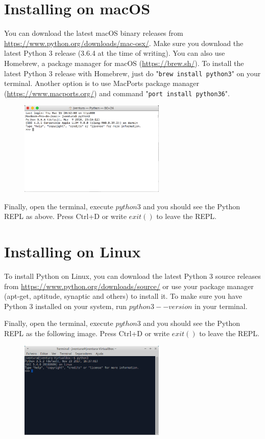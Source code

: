 \section{Installing on macOS}

You can download the latest macOS binary releases from \url{https://www.python.org/downloads/mac-osx/}. Make sure you download the latest Python 3 release (3.6.4 at the time of writing). You can also use Homebrew, a package manager for macOS (\url{https://brew.sh/}). To install the latest Python 3 release with Homebrew, just do "\texttt{brew install python3}" on your terminal. Another option is to use MacPorts package manager (\url{https://www.macports.org/}) and command "\texttt{port install python36}".  


\begin{figure}[H]
	\centering
  	\includegraphics[width=0.62\textwidth]{images/python_macos.png}
\end{figure}

Finally, open the terminal, execute $python3$ and you should see the Python REPL as above. Press Ctrl+D or write $exit()$ to leave the REPL.

\section{Installing on Linux}

To install Python on Linux, you can download the latest Python 3 source releases from \url{https://www.python.org/downloads/source/} or use your package manager (apt-get, aptitude, synaptic and others) to install it. To make sure you have Python 3 installed on your system, run $python3 --version$ in your terminal.

Finally, open the terminal, execute $python3$ and you should see the Python REPL as the following image. Press Ctrl+D or write $exit()$ to leave the REPL.

\begin{figure}[H]
	\centering
  	\includegraphics[width=0.62\textwidth]{images/python_linux.png}
\end{figure}
